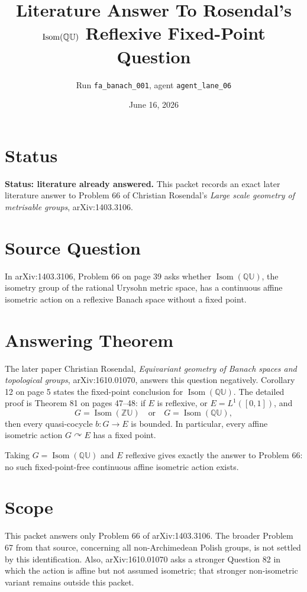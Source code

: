 \documentclass[11pt]{article}
\title{Literature Answer To Rosendal's \(\operatorname{Isom}(\QU)\)
Reflexive Fixed-Point Question}
\author{Run \texttt{fa\_banach\_001}, agent \texttt{agent\_lane\_06}}
\date{June 16, 2026}
\newcommand{\QU}{\mathbb Q\mathbb U}
\newcommand{\ZU}{\mathbb Z\mathbb U}
\begin{document}
\maketitle

\section*{Status}

\textbf{Status: literature already answered.}  This packet records an exact
later literature answer to Problem 66 of Christian Rosendal's
\emph{Large scale geometry of metrisable groups}, arXiv:1403.3106.

\section*{Source Question}

In arXiv:1403.3106, Problem 66 on page 39 asks whether
\(\operatorname{Isom}(\QU)\), the isometry group of the rational Urysohn metric
space, has a continuous affine isometric action on a reflexive Banach space
without a fixed point.

\section*{Answering Theorem}

The later paper Christian Rosendal, \emph{Equivariant geometry of Banach spaces
and topological groups}, arXiv:1610.01070, answers this question negatively.
Corollary 12 on page 5 states the fixed-point conclusion for
\(\operatorname{Isom}(\QU)\).  The detailed proof is Theorem 81 on pages
47--48: if \(E\) is reflexive, or \(E=L^1([0,1])\), and
\[
  G=\operatorname{Isom}(\ZU)\quad\text{or}\quad G=\operatorname{Isom}(\QU),
\]
then every quasi-cocycle \(b:G\to E\) is bounded.  In particular, every affine
isometric action \(G\curvearrowright E\) has a fixed point.

Taking \(G=\operatorname{Isom}(\QU)\) and \(E\) reflexive gives exactly the
answer to Problem 66: no such fixed-point-free continuous affine isometric
action exists.

\section*{Scope}

This packet answers only Problem 66 of arXiv:1403.3106.  The broader Problem
67 from that source, concerning all non-Archimedean Polish groups, is not
settled by this identification.  Also, arXiv:1610.01070 asks a stronger
Question 82 in which the action is affine but not assumed isometric; that
stronger non-isometric variant remains outside this packet.
\end{document}
